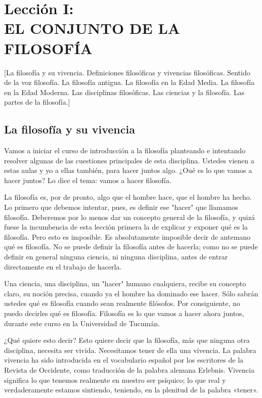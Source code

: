 \documentclass[10pt,letterpaper]{book}
\author{Manuel Garc\'{i}a Morente}
\begin{document}
\chapter*{Lecci\'{o}n I:\\EL CONJUNTO DE LA FILOSOF\'{I}A}
[La filosofía y su vivencia. Definiciones filosóficas y vivencias filosóficas. Sentido de la voz filosofía. La filosofía antigua. La filosofía en la Edad Media. La filosofía en la Edad Moderna. Las disciplinas filosóficas. Las ciencias y la filosofía. Las partes de la filosofía.]
\section*{La filosofía y su vivencia}
Vamos a iniciar el curso de introducción a la filosofía planteando e intentando resolver algunas de las cuestiones principales de esta disciplina. Ustedes vienen a estas aulas y yo a ellas también, para hacer juntos algo. ¿Oué es lo que vamos a hacer juntos? Lo dice el tema: vamos a hacer filosofía.

La filosofía es, por de pronto, algo que el hombre hace, que el hombre ha hecho. Lo primero que debemos intentar, pues, es definir ese "hacer" que llamamos filosofía. Deberemos por lo menos dar un concepto general de la filosofía, y quizá fuese la incumbencia de esta lección primera la de explicar y exponer qué es la filosofía. Pero esto es imposible. Es absolutamente imposible decir de antemano qué es filosofía. No se
puede definir la filosofía antes de hacerla; como no se puede definir en general ninguna ciencia, ni ninguna disciplina, antes de entrar directamente en el trabajo de hacerla.

Una ciencia, una disciplina, un "hacer" humano cualquiera, recibe su concepto claro, su noción precisa, cuando ya el hombre ha dominado ese hacer. Sólo sabrán ustedes qué es filosofía cuando sean realmente filósofos. Por consiguiente, no puedo decirles qué es filosofía. Filosofía es lo que vamos a hacer ahora juntos, durante este curso en la Universidad de Tucumán.

¿Qué quiere esto decir? Esto quiere decir que la filosofía, más que ninguna otra disciplina, necesita ser vivida. Necesitamos tener de ella una \guillemoleft vivencia\guillemoright. La palabra vivencia ha sido introducida en el vocabulario español por los escritores de la Revista de Occidente, como traducción de la palabra alemana \guillemoleft Erlebnis\guillemoright. Vivencia significa lo que tenemos real­mente en nuestro ser psíquico; lo que real y verdaderamente estamos sintiendo, teniendo, en la plenitud de la palabra «tener».
\end{document}
